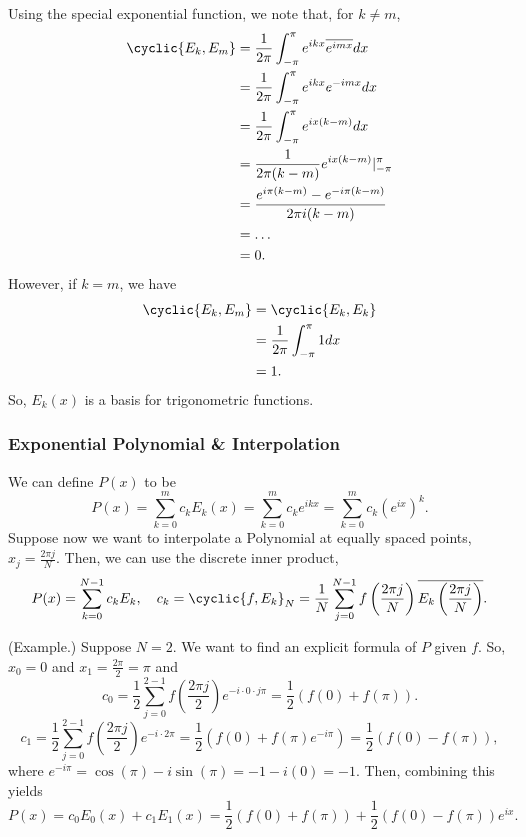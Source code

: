 \documentclass[letterpaper]{article}
\begin{document}
Using the special exponential function, we note that, for $k \neq m$, 
\[\begin{aligned}
    \cyclic{E_k, E_m} &= \frac{1}{2\pi} \int_{-\pi}^{\pi} e^{ikx} \overline{e^{imx}} dx \\ 
        &= \frac{1}{2\pi} \int_{-\pi}^{\pi} e^{ikx} e^{-imx} dx \\ 
        &= \frac{1}{2\pi} \int_{-\pi}^{\pi} e^{ix(k - m)} dx \\ 
        &= \frac{1}{2\pi(k - m)} e^{ix(k - m)} \rvert_{-\pi}^{\pi} \\ 
        &= \frac{e^{i\pi (k - m)} - e^{-i\pi(k - m)}}{2\pi i (k - m)} \\ 
        &= \hdots \\ 
        &= 0. 
\end{aligned}\]
However, if $k = m$, we have 
\[\begin{aligned}
    \cyclic{E_{k}, E_{m}} &= \cyclic{E_{k}, E_{k}} \\ 
        &= \frac{1}{2\pi} \int_{-\pi}^{\pi} 1 dx \\ 
        &= 1.
\end{aligned}\]
So, $E_{k}(x)$ is a basis for trigonometric functions. 

\subsubsection{Exponential Polynomial \& Interpolation}
We can define $P(x)$ to be 
\[P(x) = \sum_{k = 0}^{m} c_{k} E_{k}(x) = \sum_{k = 0}^{m} c_{k} e^{ikx} = \sum_{k = 0}^{m} c_{k} \left(e^{ix}\right)^k.\]
Suppose now we want to interpolate a Polynomial at equally spaced points, $x_{j} = \frac{2\pi j}{N}.$ Then, we can use the discrete inner product, 
\[P(x) = \sum_{k = 0}^{N - 1} c_{k} E_{k}, \quad c_{k} = \cyclic{f, E_{k}}_{N} = \frac{1}{N} \sum_{j = 0}^{N - 1} f\left(\frac{2\pi j}{N}\right) \overline{E_{k}\left(\frac{2\pi j}{N}\right)}.\]

\begin{mdframed}
    (Example.) Suppose $N = 2$. We want to find an explicit formula of $P$ given $f$. So, $x_{0} = 0$ and $x_{1} = \frac{2\pi}{2} = \pi$ and
    \[c_{0} = \frac{1}{2} \sum_{j = 0}^{2 - 1} f\left(\frac{2\pi j}{2}\right) e^{-i \cdot 0 \cdot j\pi} = \frac{1}{2} (f(0) + f(\pi)).\]
    \[c_{1} = \frac{1}{2} \sum_{j = 0}^{2 - 1} f\left(\frac{2\pi j}{2}\right) e^{-i \cdot 2\pi} = \frac{1}{2}\left(f(0) + f(\pi)e^{-i\pi}\right) = \frac{1}{2} (f(0) - f(\pi)),\]
    where $e^{-i\pi} = \cos(\pi) - i\sin(\pi) = -1 - i(0) = -1$. Then, combining this yields 
    \[P(x) = c_{0}E_{0}(x) + c_{1}E_{1}(x) = \frac{1}{2}(f(0) + f(\pi)) + \frac{1}{2}(f(0) - f(\pi)) e^{ix}.\]
\end{mdframed}
\end{document}
